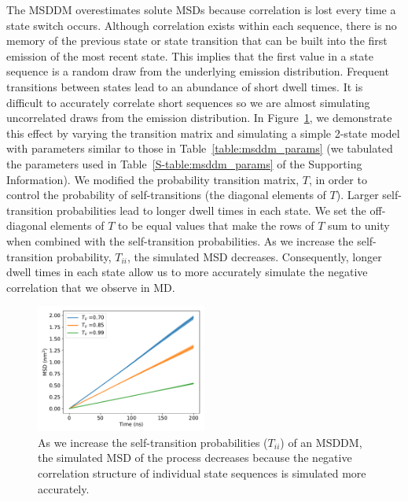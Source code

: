 \documentclass{article}
\begin{document}
 
  The MSDDM overestimates solute MSDs because correlation is lost every time a
  state switch occurs. Although correlation exists within each sequence, there
  is no memory of the previous state or state transition that can be built into
  the first emission of the most recent state. This implies that the first 
  value in a state sequence is a random draw from the underlying emission 
  distribution. Frequent transitions between states lead to an abundance of 
  short dwell times. It is difficult to accurately correlate short sequences so
  we are almost simulating uncorrelated draws from the emission distribution.
  In Figure~\ref{fig:T_sensitivity}, we demonstrate this effect by varying the
  transition matrix and simulating a simple 2-state model with parameters similar
  to those in Table~\ref{table:msddm_params} (we tabulated the parameters used 
  in Table~\ref{S-table:msddm_params} of the Supporting Information). We modified
  the probability transition matrix, $T$, in order to control the probability of 
  self-transitions (the diagonal elements of $T$). Larger self-transition 
  probabilities lead to longer dwell times in each state. We set the off-diagonal
  elements of $T$ to be equal values that make the rows of $T$ sum to unity when
  combined with the self-transition probabilities. As we increase the 
  self-transition probability, $T_{ii}$, the simulated MSD decreases. Consequently,
  longer dwell times in each state allow us to more accurately simulate the
  negative correlation that we observe in MD.
  
  \begin{figure}
  \centering
  \includegraphics[width=0.5\textwidth]{T_sensitivity.pdf}
  \caption{As we increase the self-transition probabilities ($T_{ii}$) of an MSDDM,
  the simulated MSD of the process decreases because the negative correlation structure
  of individual state sequences is simulated more accurately.}\label{fig:T_sensitivity}
  \end{figure}
  
\end{document}
